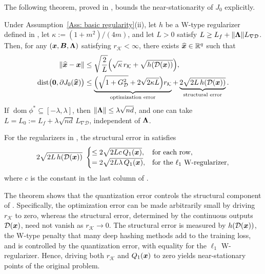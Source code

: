 The following theorem, proved in , bounds the near-stationarity of $J_0$ explicitly.
\begin{theorem}\label{prop:original-certificate}
Under Assumption~\ref{Ass: basic regularity}(ii), let $h$ be a W-type regularizer defined in , let $\kappa:=(1+m^2)/(4m)$, and let $L>0$ satisfy $L\ge L_f+\|\bm{\Lambda}\|L_{\nabla\mathcal{D}}$. Then, for any $(\bm{x},\bm{B},\bm{\Lambda})$ satisfying $r_{\mathcal{K}}<\infty$, there exists $\widehat{\bm{x}}\in\mathbb{R}^q$ such that
\begin{align*}
\|\widehat{\bm{x}}-\bm{x}\|
&\le\sqrt{\frac{2}{L}}
\Bigl(\sqrt{\kappa}\,r_{\mathcal{K}}
+\sqrt{h(\mathcal{D}(\bm{x}))}\Bigr),\\
\operatorname{dist}\bigl(\bm{0},\partial J_0(\widehat{\bm{x}})\bigr)
&\le
\underbrace{
\Bigl(\sqrt{1+G_{\mathcal{D}}^2}
+2\sqrt{2\kappa L}\Bigr)r_{\mathcal{K}}
}_{\text{optimization error}}
+\underbrace{
2\sqrt{2L\,h(\mathcal{D}(\bm{x}))}
}_{\text{structural error}}.
\end{align*}
If $\operatorname{dom}\phi^*\subseteq[-\lambda,\lambda]$, then $\|\bm{\Lambda}\|\le\lambda\sqrt{nd}$, and one can take $L=L_0:=L_f+\lambda\sqrt{nd}\,L_{\nabla\mathcal{D}}$, independent of $\bm{\Lambda}$.
\end{theorem}

For the regularizers in , the structural error in  satisfies
\[
2\sqrt{2L\,h(\mathcal{D}(\bx))}\ 
\begin{cases}
\le 2\sqrt{2Lc\,Q_1(\bx)}, & \text{for each row},\\
= 2\sqrt{2L\lambda\,Q_1(\bx)}, & \text{for the $\ell_1$ W-regularizer},
\end{cases}
\]
where $c$ is the constant in the last column of .


{The theorem shows that the quantization error controls the structural component of .} Specifically, the optimization error can be made arbitrarily small by driving $r_{\mathcal{K}}$ to zero, whereas the structural error, determined by the continuous outputs $\mathcal{D}(\bm{x})$, need not vanish as $r_{\mathcal{K}}\to0$. The structural error is measured by $h(\mathcal{D}(\bm{x}))$, the W-type penalty that many deep hashing methods add to the training loss, and is controlled by the quantization error, with equality for the $\ell_1$ W-regularizer. Hence, driving both $r_{\mathcal{K}}$ and $Q_1(\bm{x})$ to zero yields near-stationary points of the original problem.

